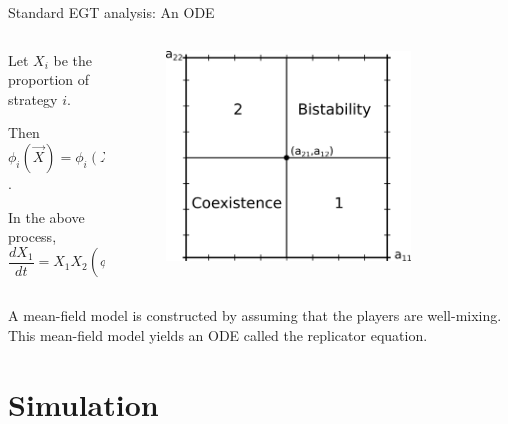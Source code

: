 \documentclass{beamer}
\begin{document}
\begin{frame}{Standard EGT analysis: An ODE}
\begin{columns}[c]
  \begin{column}{0.4\textwidth}
    Let $X_i$ be the proportion of strategy $i$. 

Then $\phi_i(\vec{X}) = \phi_i(X_1,X_2) = \sum_{j=1}^n a_{ij}X_j$.

In the above process,
\[
    \frac{dX_1}{dt} = X_1X_2\left(\phi_1(\vec{X})-\phi_2(\vec{X})\right).
\]
  \end{column}
  \begin{column}{0.6\textwidth}
\begin{figure}
  \includegraphics[width=0.8\textwidth]{./images/replicator_bifurcation_diagram.eps}
\end{figure}
  \end{column}
\end{columns}
\begin{block}{}
A mean-field model is constructed by assuming that the players are well-mixing. This mean-field model yields an ODE called the replicator equation.
\end{block}
\end{frame}
\section{Simulation}
\end{document}
